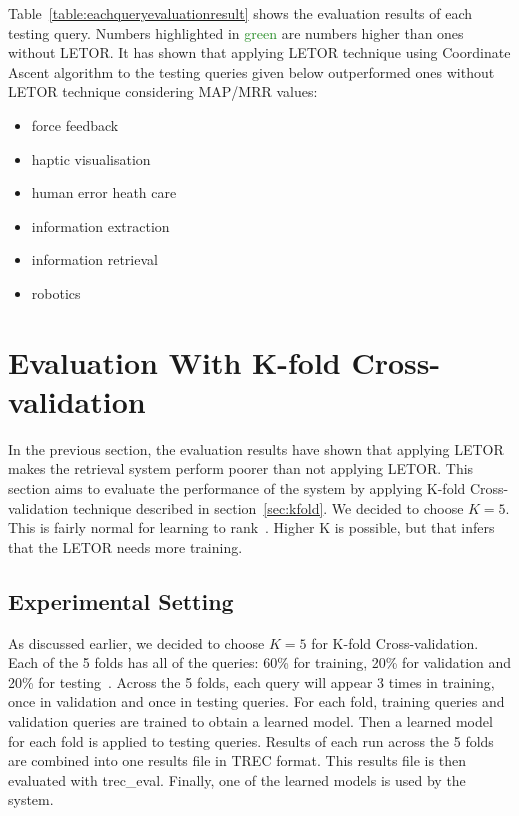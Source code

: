 Table~\ref{table:eachqueryevaluationresult} shows the evaluation results of each testing query. Numbers highlighted in \textcolor{ForestGreen}{green}
are numbers higher than ones without LETOR. It has shown that applying LETOR technique using
Coordinate Ascent algorithm to the testing queries given below outperformed ones without LETOR technique considering MAP/MRR values:
\begin{itemize}
 \item force feedback
 \item haptic visualisation
 \item human error heath care
 \item information extraction
 \item information retrieval
 \item robotics
\end{itemize}

\section{Evaluation With K-fold Cross-validation}
In the previous section, the evaluation results have shown that applying LETOR makes the retrieval system perform poorer than not applying LETOR. 
This section aims to evaluate the performance of the system by applying K-fold Cross-validation
technique described in section~\ref{sec:kfold}. We decided to choose $K = 5$. This is fairly normal for learning to rank~\cite{craig}.
Higher K is possible, but that infers that the LETOR needs more training.


\subsection{Experimental Setting}
As discussed earlier, we decided to choose $K = 5$ for K-fold Cross-validation. Each of the 5 folds has all of the queries: 60\% for training, 
20\% for validation and 20\% for testing~\cite{kfoldcv}. Across the 5 folds, each query will appear 3 times in training, once in validation and 
once in testing queries. For each fold, training queries and validation queries are trained to obtain a learned model.
Then a learned model for each fold is applied to testing queries. Results of each run across the 5 folds are combined into one results file in
TREC format. This results file is then evaluated with trec\_eval. Finally, one of the learned models is used by the system.

